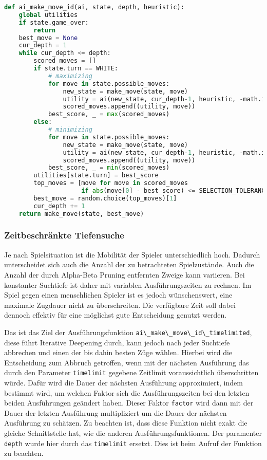 \begin{lstlisting}[language=Python]
def ai_make_move_id(ai, state, depth, heuristic):
    global utilities
    if state.game_over:
        return
    best_move = None
    cur_depth = 1
    while cur_depth <= depth:
        scored_moves = []
        if state.turn == WHITE:
            # maximizing
            for move in state.possible_moves:
                new_state = make_move(state, move)
                utility = ai(new_state, cur_depth-1, heuristic, -math.inf, math.inf)
                scored_moves.append((utility, move))
            best_score, _ = max(scored_moves)
        else:
            # minimizing
            for move in state.possible_moves:
                new_state = make_move(state, move)
                utility = ai(new_state, cur_depth-1, heuristic, -math.inf, math.inf)
                scored_moves.append((utility, move))
            best_score, _ = min(scored_moves)
        utilities[state.turn] = best_score
        top_moves = [move for move in scored_moves
                     if abs(move[0] - best_score) <= SELECTION_TOLERANCE]
        best_move = random.choice(top_moves)[1]
        cur_depth += 1
    return make_move(state, best_move)
\end{lstlisting}

\hypertarget{zeitbeschruxe4nkte-tiefensuche}{%
\subsubsection{Zeitbeschränkte
Tiefensuche}\label{zeitbeschruxe4nkte-tiefensuche}}

Je nach Spielsituation ist die Mobilität der Spieler unterschiedlich
hoch. Dadurch unterscheidet sich auch die Anzahl der zu betrachteten
Spielzustände. Auch die Anzahl der durch Alpha-Beta Pruning entfernten
Zweige kann variieren. Bei konstanter Suchtiefe ist daher mit variablen
Ausführungszeiten zu rechnen. Im Spiel gegen einen menschlichen Spieler
ist es jedoch wünschenswert, eine maximale Zugdauer nicht zu
überschreiten. Die verfügbare Zeit soll dabei dennoch effektiv für eine
möglichst gute Entscheidung genutzt werden.

Das ist das Ziel der Ausführungsfunktion
\passthrough{\lstinline!ai\_make\_move\_id\_timelimited!}, diese führt
Iterative Deepening durch, kann jedoch nach jeder Suchtiefe abbrechen
und einen der bis dahin besten Züge wählen. Hierbei wird die
Entscheidung zum Abbruch getroffen, wenn mit der nächsten Ausführung das
durch den Parameter \passthrough{\lstinline!timelimit!} gegebene
Zeitlimit voraussichtlich überschritten würde. Dafür wird die Dauer der
nächsten Ausführung approximiert, indem bestimmt wird, um welchen Faktor
sich die Ausführungszeiten bei den letzten beiden Ausführungen geändert
haben. Dieser Faktor \passthrough{\lstinline!factor!} wird dann mit der
Dauer der letzten Ausführung multipliziert um die Dauer der nächsten
Ausführung zu schätzen. Zu beachten ist, dass diese Funktion nicht exakt
die gleiche Schnittstelle hat, wie die anderen Ausführungsfunktionen.
Der paramenter \passthrough{\lstinline!depth!} wurde hier durch das
\passthrough{\lstinline!timelimit!} ersetzt. Dies ist beim Aufruf der
Funktion zu beachten.


